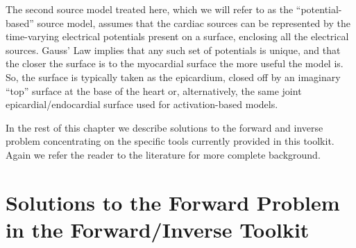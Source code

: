 The second source model treated here, which we will refer to as the
``potential-based'' source model, assumes that the cardiac sources can be
represented by the time-varying electrical potentials present on a surface,
enclosing all the electrical sources. Gauss' Law implies that any such set
of potentials is unique, and that the closer the surface is to the myocardial
surface the more useful the model is. So, the surface is typically taken as
the epicardium, closed off by an imaginary ``top'' surface at the base of
the heart or, alternatively, the same joint epicardial/endocardial surface
used for activation-based models.

In the rest of this chapter we describe solutions to the forward and
inverse problem concentrating on the specific tools currently provided in
this toolkit. Again we refer the reader to the literature for more complete
background.

\section{Solutions to the Forward Problem in the Forward/Inverse Toolkit}

